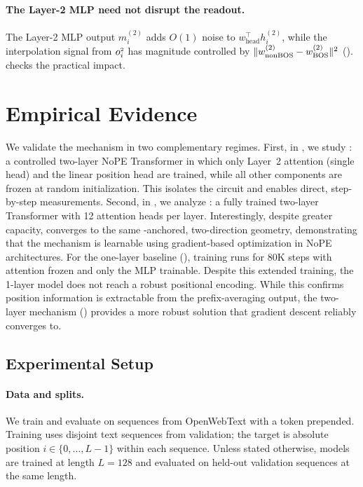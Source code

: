 \documentclass{article}
\theoremstyle{plain}
\theoremstyle{definition}
\theoremstyle{remark}
\begin{document}
\paragraph{The Layer-2 MLP need not disrupt the readout.}
The Layer-2 MLP output $m_i^{(2)}$ adds $O(1)$ noise to $w_{\text{head}}^\top h_i^{(2)}$, while the interpolation signal from $o_{i}^{\scriptscriptstyle 2}$ has magnitude controlled by $\|w_{\text{nonBOS}}^{(2)}-w_{\text{BOS}}^{(2)}\|^2$ ().
 checks the practical impact.

\section{Empirical Evidence}
\label{sec:empirical}

We validate the mechanism in two complementary regimes.
First, in , we study \modelminimal: a controlled two-layer NoPE Transformer in which only Layer~2 attention (single head) and the linear position head are trained, while all other components are frozen at random initialization.
This isolates the circuit and enables direct, step-by-step measurements.
Second, in , we analyze \modelfull: a fully trained two-layer Transformer with 12 attention heads per layer.
Interestingly, despite greater capacity, \modelfull converges to the same \bos-anchored, two-direction geometry, demonstrating that the mechanism is learnable using gradient-based optimization in NoPE architectures.
For the one-layer baseline (), training runs for 80K steps with attention frozen and only the MLP trainable.
Despite this extended training, the 1-layer model does not reach a robust positional encoding. While this confirms position information is extractable from the prefix-averaging output, the two-layer mechanism () provides a more robust solution that gradient descent reliably converges to.

\subsection{Experimental Setup}
\paragraph{Data and splits.}
We train and evaluate on sequences from OpenWebText \citep{openwebtext} with a \bos token prepended.
Training uses disjoint text sequences from validation; the target is absolute position $i\in\{0,\dots,L{-}1\}$ within each sequence.
Unless stated otherwise, models are trained at length $L=128$ and evaluated on held-out validation sequences at the same length.
\end{document}
